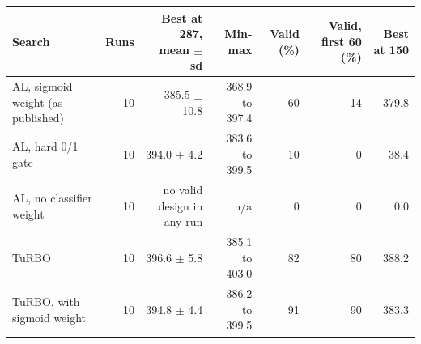 \begin{tabular}{@{}lrrrrrr@{}}
\toprule
Search & Runs & Best at 287, mean $\pm$ sd & Min-max & Valid (\%) & Valid, first 60 (\%) & Best at 150 \\
\midrule
AL, sigmoid weight (as published) & 10 & 385.5 $\pm$ 10.8 & 368.9 to 397.4 & 60 & 14 & 379.8 \\
AL, hard 0/1 gate & 10 & 394.0 $\pm$ 4.2 & 383.6 to 399.5 & 10 & 0 & 38.4 \\
AL, no classifier weight & 10 & no valid design in any run & n/a & 0 & 0 & 0.0 \\
TuRBO & 10 & 396.6 $\pm$ 5.8 & 385.1 to 403.0 & 82 & 80 & 388.2 \\
TuRBO, with sigmoid weight & 10 & 394.8 $\pm$ 4.4 & 386.2 to 399.5 & 91 & 90 & 383.3 \\
\bottomrule
\end{tabular}
